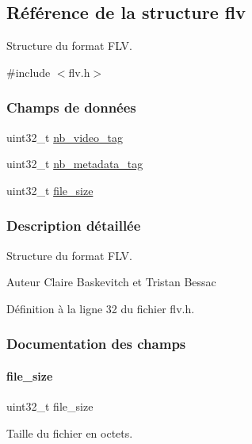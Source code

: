 \hypertarget{a00166}{}\subsection{Référence de la structure flv}
\label{a00166}


Structure du format F\+LV.  




{\ttfamily \#include $<$flv.\+h$>$}

\subsubsection*{Champs de données}
\begin{DoxyCompactItemize}
\item 
uint32\+\_\+t \hyperlink{a00166_aa9ec6aaa8a2303b01ea8da69314e8a29}{nb\+\_\+video\+\_\+tag}
\item 
uint32\+\_\+t \hyperlink{a00166_a4c809685cb46c0124ea990d5c5f73a10}{nb\+\_\+metadata\+\_\+tag}
\item 
uint32\+\_\+t \hyperlink{a00166_acfc905fb689f590842c0152e3b8cd92e}{file\+\_\+size}
\end{DoxyCompactItemize}


\subsubsection{Description détaillée}
Structure du format F\+LV. 

\begin{DoxyAuthor}{Auteur}
Claire Baskevitch et Tristan Bessac 
\end{DoxyAuthor}


Définition à la ligne 32 du fichier flv.\+h.



\subsubsection{Documentation des champs}
\mbox{\label{a00166_acfc905fb689f590842c0152e3b8cd92e}} 
\paragraph{\texorpdfstring{file\+\_\+size}{file\_size}}
{\footnotesize\ttfamily uint32\+\_\+t file\+\_\+size}

Taille du fichier en octets. 

